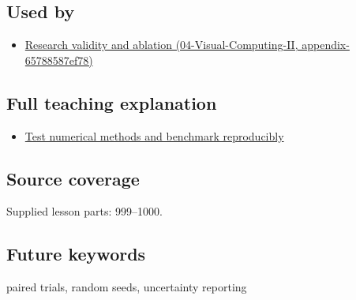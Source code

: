 \subsection{Used by}\label{appendix-b9db93e28371-used-by}

\begin{itemize}
\tightlist
\item
  \href{../04-Visual-Computing-II/main.pdf\#nameddest=appendix-65788587ef78}{Research validity and ablation (04-Visual-Computing-II, appendix-65788587ef78)}
\end{itemize}

\subsection{Full teaching explanation}\label{appendix-b9db93e28371-full-teaching-explanation}

\begin{itemize}
\tightlist
\item
  \hyperref[02-foundations-ii-ch031-test-numerical-methods-and-benchmark-reproducibly]{Test numerical methods and benchmark reproducibly}
\end{itemize}

\subsection{Source coverage}\label{appendix-b9db93e28371-source-coverage}

Supplied lesson parts: 999--1000.

\subsection{Future keywords}\label{appendix-b9db93e28371-future-keywords}

paired trials, random seeds, uncertainty reporting
